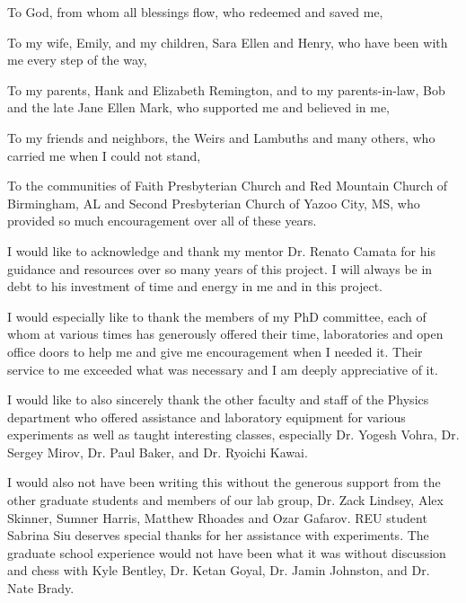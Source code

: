 \documentclass[phd, reqno]{uab-thesis}   %
\begin{document}
\begin{dedication}
To God, from whom all blessings flow, who redeemed and saved me,

To my wife, Emily, and my children, Sara Ellen and Henry, who have been with me every step of the way,

To my parents, Hank and Elizabeth Remington, and to my parents-in-law, Bob and the late Jane Ellen Mark, who supported me and believed in me,

To my friends and neighbors, the Weirs and Lambuths and many others, who carried me when I could not stand, 

To the communities of Faith Presbyterian Church and Red Mountain Church of Birmingham, AL and Second Presbyterian Church of Yazoo City, MS, who provided so much encouragement over all of these years. 

\end{dedication}
%
\begin{acknowledgments}
I would like to acknowledge and thank my mentor Dr. Renato Camata for his guidance and resources over so many years of this project. I will always be in debt to his investment of time and energy in me and in this project. 

I would especially like to thank the members of my PhD committee, each of whom at various times has generously offered their time, laboratories and open office doors to help me and give me encouragement when I needed it. Their service to me exceeded what was necessary and I am deeply appreciative of it. 

I would like to also sincerely thank the other faculty and staff of the Physics department who offered assistance and laboratory equipment for various experiments as well as taught interesting classes, especially Dr. Yogesh Vohra, Dr. Sergey Mirov, Dr. Paul Baker, and Dr. Ryoichi Kawai.

I would also not have been writing this without the generous support from the other graduate students and members of our lab group, Dr. Zack Lindsey, Alex Skinner, Sumner Harris, Matthew Rhoades and Ozar Gafarov. REU student Sabrina Siu deserves special thanks for her assistance with experiments. The graduate school experience would not have been what it was without discussion and chess with Kyle Bentley, Dr. Ketan Goyal, Dr. Jamin Johnston, and Dr. Nate Brady. 
\end{acknowledgments}
%
\tableofcontents

%

{\countdef{}\singlespacing\setlength{\parskip}{12pt}
\listoftables
{}
\listoffigures
{}
}
\end{document}
